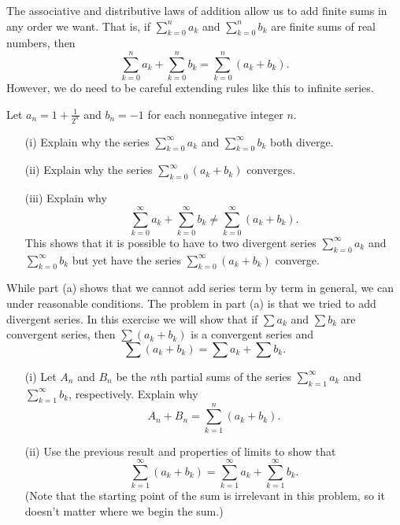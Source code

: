 \begin{exercises}
\begin{exerciseSolution}
\end{exerciseSolution}

\ea	

\item The associative and distributive laws of addition allow us to add finite sums in any order we want. That is, if $ \sum_{k=0}^n a_k$ and $ \sum_{k=0}^n b_k$ are finite sums of real numbers, then
\[\sum_{k=0}^{n} a_k + \sum_{k=0}^n b_k = \sum_{k=0}^n (a_k+b_k).\]
However, we do need to be careful extending rules like this to infinite series.
\ba
\item Let $a_n =  1 + \frac{1}{2^n}$ and $b_n = -1$ for each nonnegative integer $n$.
    \begin{itemize}
    \item[(i)] Explain why the series $ \sum_{k=0}^{\infty} a_k$ and $ \sum_{k=0}^{\infty} b_k$ both diverge. 
    
    \item[(ii)] Explain why the series $ \sum_{k=0}^{\infty} (a_k+b_k)$ converges.

    \item[(iii)] Explain why
\[\sum_{k=0}^{\infty} a_k + \sum_{k=0}^{\infty} b_k \neq \sum_{k=0}^{\infty} (a_k+b_k).\]
This shows that it is possible to have to two divergent series $ \sum_{k=0}^{\infty} a_k$ and $ \sum_{k=0}^{\infty} b_k$ but yet have the series $ \sum_{k=0}^{\infty} (a_k+b_k)$ converge.
    \end{itemize}

\item While part (a) shows that we cannot add series term by term in general, we can under reasonable conditions. The problem in part (a) is that we tried to add divergent series. In this exercise we will show that if $\sum a_k$ and $\sum b_k$ are convergent series, then $\sum (a_k+b_k)$ is a convergent series and
\[\sum (a_k+b_k) = \sum a_k + \sum b_k.\]
    \begin{itemize}
    \item[(i)] Let $A_n$ and $B_n$ be the $n$th partial sums of the series $\sum_{k=1}^{\infty} a_k$ and $\sum_{k=1}^{\infty} b_k$, respectively. Explain why
\[A_n + B_n = \sum_{k=1}^n (a_k+b_k).\]

    \item[(ii)] Use the previous result and properties of limits to show that
\[\sum_{k=1}^{\infty} (a_k+b_k) = \sum_{k=1}^{\infty} a_k + \sum_{k=1}^{\infty} b_k.\]
(Note that the starting point of the sum is irrelevant in this problem, so it doesn't matter where we begin the sum.)


\end{itemize}
\end{exercises}
